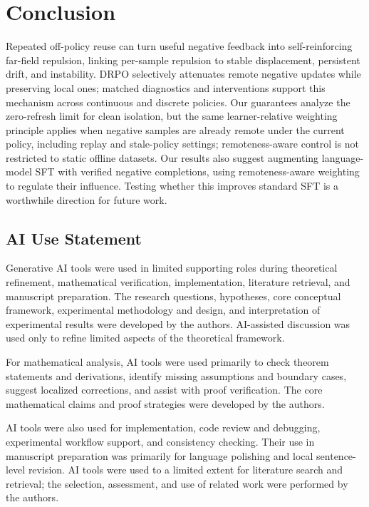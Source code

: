 \documentclass{article}
\theoremstyle{plain}
\theoremstyle{definition}
\theoremstyle{remark}
\begin{document}
\section{Conclusion}

Repeated off-policy reuse can turn useful negative feedback into
self-reinforcing far-field repulsion, linking per-sample repulsion to stable
displacement, persistent drift, and instability. DRPO selectively attenuates remote negative updates while preserving local
ones; matched diagnostics and interventions support this mechanism across
continuous and discrete policies. Our guarantees analyze the zero-refresh limit for clean isolation, but the same
learner-relative weighting principle applies when negative samples are already
remote under the current policy, including replay and stale-policy settings;
remoteness-aware control is not restricted to static offline datasets. Our
results also suggest augmenting language-model SFT with verified negative
completions, using remoteness-aware weighting to regulate their influence.
Testing whether this improves standard SFT is a worthwhile direction for
future work.

\subsection*{AI Use Statement}

Generative AI tools were used in limited supporting roles during theoretical
refinement, mathematical verification, implementation, literature retrieval,
and manuscript preparation. The research questions, hypotheses, core
conceptual framework, experimental methodology and design, and interpretation
of experimental results were developed by the authors. AI-assisted discussion
was used only to refine limited aspects of the theoretical framework.

For mathematical analysis, AI tools were used primarily to check theorem
statements and derivations, identify missing assumptions and boundary cases,
suggest localized corrections, and assist with proof verification. The core
mathematical claims and proof strategies were developed by the authors.

AI tools were also used for implementation, code review and debugging,
experimental workflow support, and consistency checking. Their use in
manuscript preparation was primarily for language polishing and local
sentence-level revision. AI tools were used to a limited extent for literature
search and retrieval; the selection, assessment, and use of related work were
performed by the authors.
\end{document}

